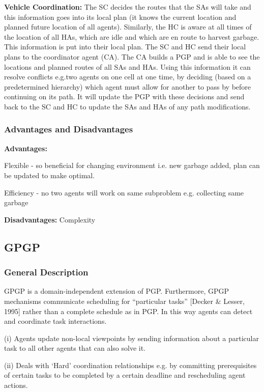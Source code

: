 \textbf{Vehicle Coordination:} The SC decides the routes that the SAs will take and this information goes into its local plan (it knows the current location and planned future location of all agents). Similarly, the HC is aware at all times of the location of all HAs, which are idle and which are en route to harvest garbage. This information is put into their local plan. The SC and HC send their local plans to the coordinator agent (CA). The CA builds a PGP and is able to see the locations and planned routes of all SAs and HAs. Using this information it can resolve conflicts e.g.two agents on one cell at one time, by deciding (based on a predetermined hierarchy) which agent must allow for another to pass by before continuing on its path. It will update the PGP with these decisions and send back to the SC and HC to update the SAs and HAs of any path modifications.

\subsubsection{Advantages and Disadvantages}

\textbf{Advantages:}

Flexible - so beneficial for changing environment i.e. new garbage added, plan can be updated to make optimal.

Efficiency - no two agents will work on same subproblem e.g. collecting same garbage

\textbf{Disadvantages:} Complexity

\subsection{GPGP}

\subsubsection{General Description}

GPGP is a domain-independent extension of PGP. Furthermore, GPGP mechanisms communicate scheduling for ``particular tasks'' [Decker \& Lesser, 1995] rather than a complete schedule as in PGP. In this way agents can detect and coordinate task interactions. 

(i) Agents update non-local viewpoints by sending information about a particular task to all other agents that can also solve it.

(ii) Deals with ‘Hard’ coordination relationships e.g. by committing prerequisites of certain tasks to be completed by a certain deadline and rescheduling agent actions. 

